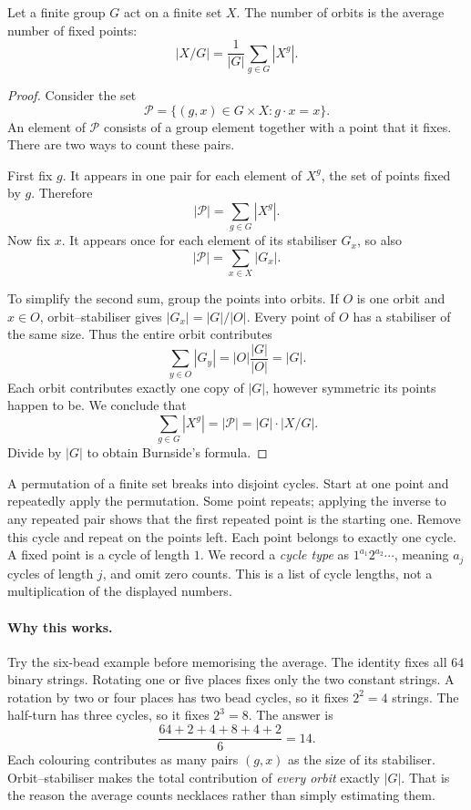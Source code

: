 \begin{theorem}\label{thm:burnside}
Let a finite group $G$ act on a finite set $X$. The number of orbits is the average number of fixed points:
\[
|X/G|=\frac1{|G|}\sum_{g\in G}|X^g|.
\]
\end{theorem}
\begin{proof}
Consider the set
\[
\mathcal P=\{(g,x)\in G\times X:g\cdot x=x\}.
\]
An element of $\mathcal P$ consists of a group element together with a point that it fixes. There are two ways to count these pairs.

First fix $g$. It appears in one pair for each element of $X^g$, the set of points fixed by $g$. Therefore
\[
|\mathcal P|=\sum_{g\in G}|X^g|.
\]
Now fix $x$. It appears once for each element of its stabiliser $G_x$, so also
\[
|\mathcal P|=\sum_{x\in X}|G_x|.
\]

To simplify the second sum, group the points into orbits. If $O$ is one orbit and $x\in O$, orbit--stabiliser gives $|G_x|=|G|/|O|$. Every point of $O$ has a stabiliser of the same size. Thus the entire orbit contributes
\[
\sum_{y\in O}|G_y|=|O|\frac{|G|}{|O|}=|G|.
\]
Each orbit contributes exactly one copy of $|G|$, however symmetric its points happen to be. We conclude that
\[
\sum_{g\in G}|X^g|=|\mathcal P|=|G|\cdot|X/G|.
\]
Divide by $|G|$ to obtain Burnside's formula.
\end{proof}

A permutation of a finite set breaks into disjoint cycles. Start at one point and repeatedly apply the permutation. Some point repeats; applying the inverse to any repeated pair shows that the first repeated point is the starting one. Remove this cycle and repeat on the points left. Each point belongs to exactly one cycle. A fixed point is a cycle of length $1$. We record a \emph{cycle type} as $1^{a_1}2^{a_2}\cdots$, meaning $a_j$ cycles of length $j$, and omit zero counts. This is a list of cycle lengths, not a multiplication of the displayed numbers.

\paragraph{Why this works.}
Try the six-bead example before memorising the average. The identity fixes all $64$ binary strings. Rotating one or five places fixes only the two constant strings. A rotation by two or four places has two bead cycles, so it fixes $2^2=4$ strings. The half-turn has three cycles, so it fixes $2^3=8$. The answer is
\[
\frac{64+2+4+8+4+2}{6}=14.
\]
Each colouring contributes as many pairs $(g,x)$ as the size of its stabiliser. Orbit--stabiliser makes the total contribution of \emph{every orbit} exactly $|G|$. That is the reason the average counts necklaces rather than simply estimating them.

